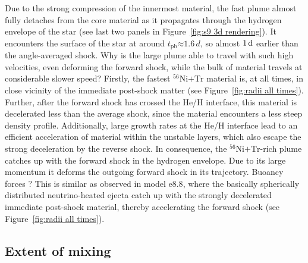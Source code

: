 \documentclass[fleqn,usenatbib]{mnras}
\newcommand{\tpb}{\ensuremath{t_{\text{pb}}}}
\newcommand{\nickel}{\ensuremath{\mathrm{^{56}Ni}}\xspace}
\newcommand{\tracer}{\ensuremath{\mathrm{Tr}}\xspace}
\newcommand{\onemg}{\ensuremath{\mathrm{e8.8}}\xspace}
\newcommand{\COM}[1]{{\color{orange}#1}}
\begin{document}
Due to the strong compression of the innermost material, the fast plume almost fully detaches from the core material as it propagates through the hydrogen envelope of the star (see last two panels in Figure~\ref{fig:s9 3d rendering}).
It encounters the surface of the star at around $\tpb \mathord{\approx} 1.6\, d$, so almost $1\,\rm d$ earlier than the angle-averaged shock.
Why is the large plume able to travel with such high velocities, even deforming the forward shock, while the bulk of material travels at considerable slower speed?
Firstly, the fastest $\nickel\mathord{+}\tracer$ material is, at all times, in close vicinity of the immediate post-shock matter (see Figure~\ref{fig:radii all times}). 
Further, after the forward shock has crossed the He/H interface, this material is decelerated less than the average shock, since the material encounters a less steep density profile.
Additionally, large growth rates at the He/H interface lead to an efficient acceleration of material within the unstable layers, which also escape the strong deceleration by the reverse shock.
In consequence, the $\nickel\mathord{+}\tracer$-rich plume catches up with the forward shock in the hydrogen envelope. Due to its large momentum it deforms the outgoing forward shock in its trajectory. \COM{Buoancy forces ?}
This is similar as observed in model \onemg, where the basically spherically distributed neutrino-heated ejecta catch up with the strongly decelerated immediate post-shock material, thereby accelerating the forward shock (see Figure~\ref{fig:radii all times}).

\subsection{Extent of mixing}
\end{document}
